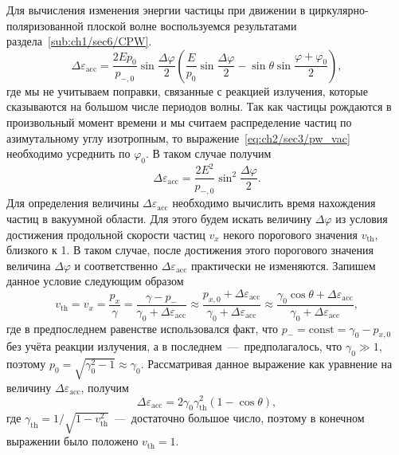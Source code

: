 Для вычисления изменения энергии частицы при движении в циркулярно-поляризованной плоской волне воспользуемся результатами раздела~\ref{sub:ch1/sec6/CPW}.
\begin{equation}
    \label{eq:ch2/sec3/pw_vac}
    \Delta\varepsilon_\mathrm{acc} = \frac{2 E p_0}{p_{-, 0}} \sin\frac{\Delta\varphi}{2} \left( \frac{E}{p_0}\sin\frac{\Delta\varphi}{2} - \sin\theta\sin\frac{\varphi+\varphi_0}{2} \right),
\end{equation}
где мы не учитываем поправки, связанные с реакцией излучения, которые сказываются на большом числе периодов волны.
Так как частицы рождаются в произвольный момент времени и мы считаем распределение частиц по азимутальному углу изотропным, то выражение~\eqref{eq:ch2/sec3/pw_vac} необходимо усреднить по $\varphi_0$.
В таком случае получим
\begin{equation}
    \label{eq:ch2/sec3/pw_vac_av}
    \Delta\varepsilon_\mathrm{acc} = \frac{2 E^2}{p_{-, 0}} \sin^2\frac{\Delta\varphi}{2}.
\end{equation}
Для определения величины $\Delta\varepsilon_\mathrm{acc}$ необходимо вычислить время нахождения частиц в вакуумной области.
Для этого будем искать величину $\Delta\varphi$ из условия достижения продольной скорости частиц $v_x$ некого порогового значения $v_\mathrm{th}$, близкого к 1. 
В таком случае, после достижения этого порогового значения величина $\Delta\varphi$ и соответственно $\Delta\varepsilon_\mathrm{acc}$ практически не изменяются.
Запишем данное условие следующим образом
\begin{equation}
    v_\mathrm{th} = v_x = \frac{p_x}{\gamma} = \frac{\gamma - p_-}{\gamma_0 + \Delta\varepsilon_\mathrm{acc}} \approx \frac{p_{x,0} + \Delta\varepsilon_\mathrm{acc}}{\gamma_0 + \Delta\varepsilon_\mathrm{acc}} \approx \frac{\gamma_0 \cos\theta + \Delta\varepsilon_\mathrm{acc}}{\gamma_0 + \Delta\varepsilon_\mathrm{acc}},
\end{equation}
где в предпоследнем равенстве использовался факт, что $p_- = \text{const} = \gamma_0 - p_{x,0}$ без учёта реакции излучения, а в последнем~---~предполагалось, что $\gamma_0 \gg 1$, поэтому $p_0 = \sqrt{\gamma_0^2 - 1}\approx\gamma_0$.
Рассматривая данное выражение как уравнение на величину $\Delta\varepsilon_\mathrm{acc}$, получим
\begin{equation}
    \label{eq:ch2/sec3/deltae}
    \Delta\varepsilon_\mathrm{acc} = 2 \gamma_0 \gamma_\mathrm{th}^2 (1 - \cos\theta),
\end{equation}
где $\gamma_\mathrm{th} = 1 / \sqrt{1 - v_\mathrm{th}^2}$~---~достаточно большое число, поэтому в конечном выражении было положено $v_\mathrm{th}=1$.
